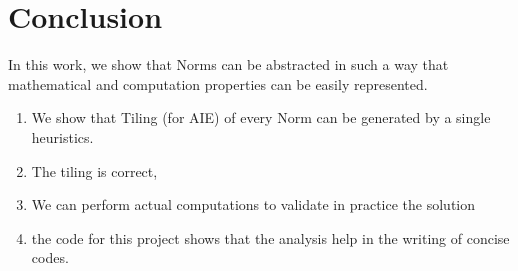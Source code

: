 \documentclass[acmsmall]{acmart}
\begin{document}
\section{Conclusion}
In this work, we show that Norms can be abstracted in such a way that
mathematical and computation properties can be easily represented.

\begin{enumerate}
  \item We show that Tiling (for AIE) of every Norm can be generated
    by a single heuristics.
  \item The tiling is correct,
  \item We can perform actual computations to validate in practice the
    solution
  \item the code for this project shows that the analysis help in the
    writing of concise codes.
\end{enumerate}

  

%

 

%
\end{document}
